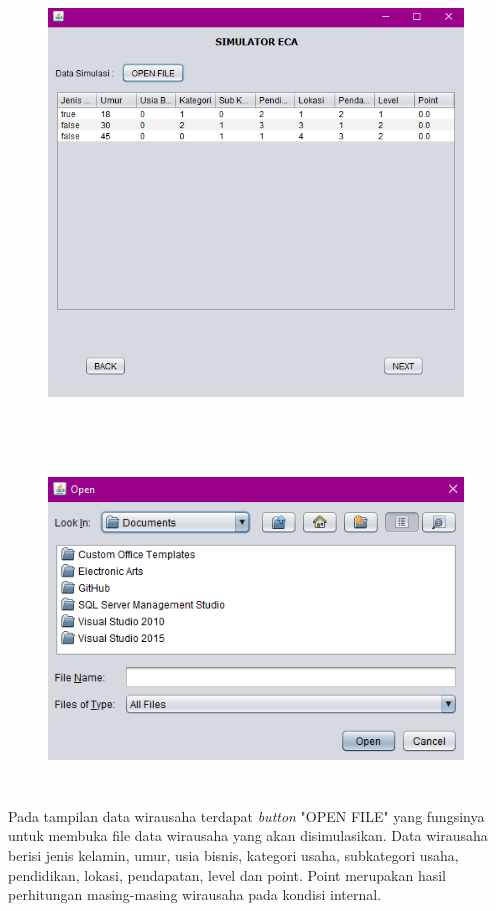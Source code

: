 \begin{figure} [H]
	\centering  
	\includegraphics[width=11cm, height=12cm]{tampilanData} 
	\label{fig:kondisiDataWirausaha} 
\end{figure}


\begin{figure} [H]
	\centering  
	\includegraphics[width=11cm, height=9cm]{tampilanBukaFile} 
	\label{fig:bukaFile} 
\end{figure}

Pada tampilan data wirausaha terdapat \textit{button} "OPEN FILE" yang fungsinya untuk membuka file data wirausaha yang akan disimulasikan. Data wirausaha berisi jenis kelamin, umur, usia bisnis, kategori usaha, subkategori usaha, pendidikan, lokasi, pendapatan, level dan point. Point merupakan hasil perhitungan masing-masing wirausaha pada kondisi internal.

